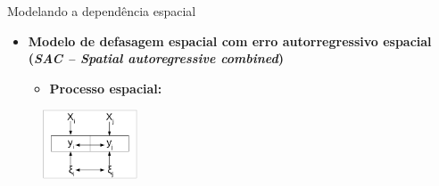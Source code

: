 \documentclass[aspectratio=169]{beamer}
\begin{document}
\begin{frame}{Modelando a dependência espacial}
    \begin{itemize}
        \item \textbf{Modelo de defasagem espacial com erro autorregressivo espacial (\textit{SAC -- Spatial autoregressive combined})}
        \vspace{0.5cm}
        \begin{itemize}
            \item \textbf{Processo espacial:}
        \end{itemize}
    \end{itemize}
    \begin{figure}
		\centering
		\includegraphics[width=0.25\textwidth]{img/reg_sac.png}
	\end{figure}
\end{frame}
\end{document}
